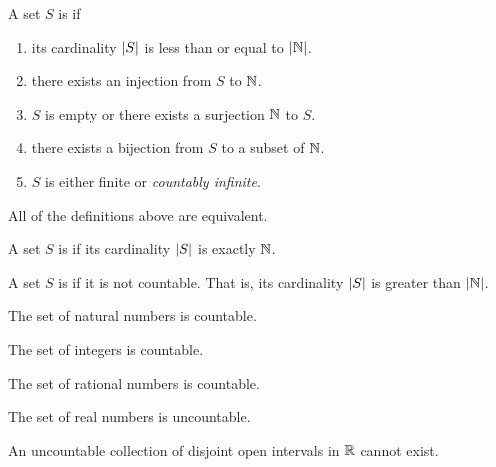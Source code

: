 \begin{definition}
  A set $S$ is  if
  \begin{enumerate}
    \item its cardinality $| S |$ is less than or equal to $| \mathbb N |$.
    \item there exists an injection from $S$ to $\NN$.
    \item $S$ is empty or there exists a surjection $\NN$ to $S$.
    \item there exists a bijection from $S$ to a subset of $\NN$.
    \item $S$ is either finite or \textit{countably infinite}.
  \end{enumerate}
  All of the definitions above are equivalent.

  A set $S$ is  if its cardinality
  $| S |$ is exactly $\NN$.

  A set $S$ is  if it is not countable. That is,
  its cardinality $| S |$ is greater than $| \mathbb N |$.
\end{definition}

\begin{corollary}[$\NN$ is countable]
  The set of natural numbers is countable.
\end{corollary}

\begin{corollary}[$\ZZ$ is countable]
  The set of integers is countable.
\end{corollary}

\begin{corollary}[$\QQ$ is countable]
  The set of rational numbers is countable.
\end{corollary}

\begin{corollary}[$\RR$ is uncountable]
  The set of real numbers is uncountable.
\end{corollary}

\begin{theorem}
  An uncountable collection of disjoint open intervals in $\RR$ cannot exist.
\end{theorem}

